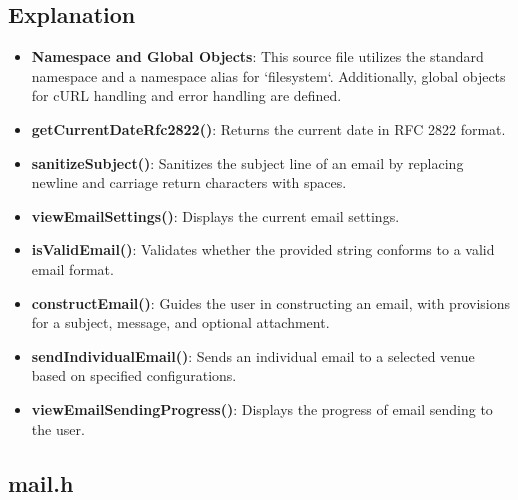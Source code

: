 \documentclass{article}
\begin{document}
	\subsection*{Explanation}
	\begin{itemize}
		\item \textbf{Namespace and Global Objects}: This source file utilizes the standard namespace and a namespace alias for `filesystem`. Additionally, global objects for cURL handling and error handling are defined.
		\item \textbf{getCurrentDateRfc2822()}: Returns the current date in RFC 2822 format.
		\item \textbf{sanitizeSubject()}: Sanitizes the subject line of an email by replacing newline and carriage return characters with spaces.
		\item \textbf{viewEmailSettings()}: Displays the current email settings.
		\item \textbf{isValidEmail()}: Validates whether the provided string conforms to a valid email format.
		\item \textbf{constructEmail()}: Guides the user in constructing an email, with provisions for a subject, message, and optional attachment.
		\item \textbf{sendIndividualEmail()}: Sends an individual email to a selected venue based on specified configurations.
		\item \textbf{viewEmailSendingProgress()}: Displays the progress of email sending to the user.
	\end{itemize}
	
	\subsection{mail.h}
	
\end{document}

